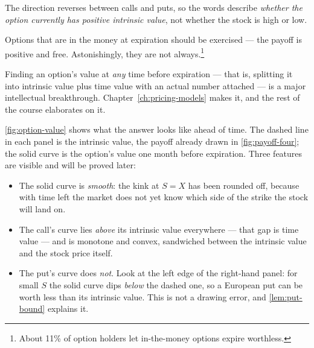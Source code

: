 \begin{note}
	The direction reverses between calls and puts, so the words describe \emph{whether the option currently has positive intrinsic value}, not whether the stock is high or low.
\end{note}
\suppend

Options that are in the money at expiration should be exercised --- the payoff is positive and free.
Astonishingly, they are not always.\footnote{About 11\% of option holders let in-the-money options expire worthless.}

Finding an option's value at \emph{any} time before expiration --- that is, splitting it into intrinsic value plus time value with an actual number attached --- is a major intellectual breakthrough. Chapter~\ref{ch:pricing-models} makes it, and the rest of the course elaborates on it.


\suppstart
\autoref{fig:option-value} shows what the answer looks like ahead of time.
The dashed line in each panel is the intrinsic value, the payoff already drawn in \autoref{fig:payoff-four}; the solid curve is the option's value one month before expiration.
Three features are visible and will be proved later:

\begin{itemize}[itemsep=0.3em]
	\item The solid curve is \emph{smooth}: the kink at $S=X$ has been rounded off, because with time left the market does not yet know which side of the strike the stock will land on.
	\item The call's curve lies \emph{above} its intrinsic value everywhere --- that gap is time value --- and is monotone and convex, sandwiched between the intrinsic value and the stock price itself.
	\item The put's curve does \emph{not}. Look at the left edge of the right-hand panel: for small $S$ the solid curve dips \emph{below} the dashed one, so a European put can be worth less than its intrinsic value. This is not a drawing error, and \autoref{lem:put-bound} explains it.
\end{itemize}
\suppend

